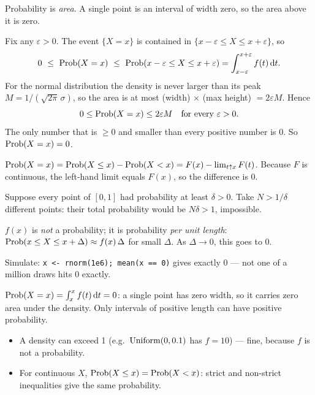 \documentclass[11pt]{article}
\begin{document}
\begin{keyidea}
Probability is \emph{area}. A single point is an interval of width zero, so the area above it is zero.
\end{keyidea}

\solution
{}
Fix any $\varepsilon>0$. The event $\{X=x\}$ is contained in $\{x-\varepsilon\le X\le x+\varepsilon\}$, so
\[
0\ \le\ \Prob(X=x)\ \le\ \Prob(x-\varepsilon\le X\le x+\varepsilon)=\int_{x-\varepsilon}^{x+\varepsilon}f(t)\dd t.
\]
For the normal distribution the density is never larger than its peak $M=1/(\sqrt{2\pi}\,\sigma)$, so the area is at most (width) $\times$ (max height) $=2\varepsilon M$. Hence
\[
0\le\mathrm{Prob}(X=x)\le2\varepsilon M\quad\text{for every }\varepsilon>0.
\]
The only number that is $\ge0$ and smaller than every positive number is 0. So $\mathrm{Prob}(X=x)=0$.

$\mathrm{Prob}(X=x)=\mathrm{Prob}(X\le x)-\mathrm{Prob}(X<x)=F(x)-\lim_{t\uparrow x}F(t)$. Because $F$ is continuous, the left-hand limit equals $F(x)$, so the difference is 0.

Suppose every point of $[0,1]$ had probability at least $\delta>0$. Take $N>1/\delta$ different points: their total probability would be $N\delta>1$, impossible.

$f(x)$ is \emph{not} a probability; it is probability \emph{per unit length}:
$\mathrm{Prob}(x\le X\le x+\Delta)\approx f(x)\,\Delta$ for small $\Delta$. As $\Delta\to0$, this goes to 0.

\begin{sanity}
Simulate: \texttt{x <- rnorm(1e6); mean(x == 0)} gives exactly 0 --- not one of a million draws hits 0 exactly.
\end{sanity}

\begin{answer}
$\mathrm{Prob}(X=x)=\int_x^xf(t)\,\mathrm{d} t=0$: a single point has zero width, so it carries zero area under the density. Only intervals of positive length can have positive probability.
\end{answer}

\begin{takeaway}
\begin{itemize}
\item A density can exceed 1 (e.g.\ $\mathrm{Uniform}(0,0.1)$ has $f=10$) --- fine, because $f$ is not a probability.
\item For continuous $X$, $\mathrm{Prob}(X\le x)=\mathrm{Prob}(X<x)$: strict and non-strict inequalities give the same probability.
\end{itemize}
\end{takeaway}
\end{document}
